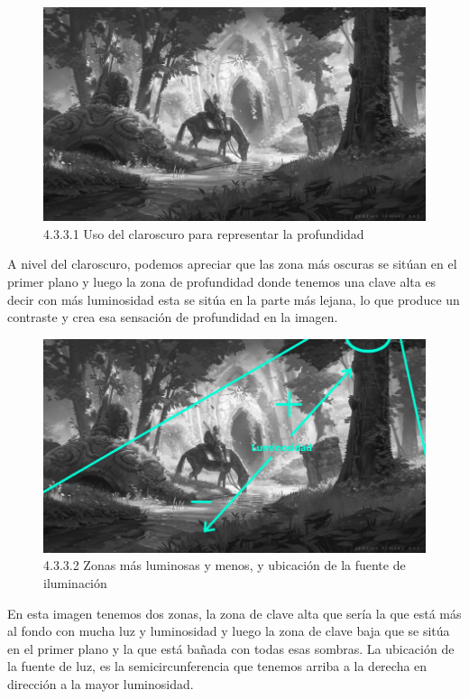 \documentclass[12pt]{article}
\begin{document}
        
    \begin{figure}[H]
      \centering
      \includegraphics[scale=0.7]{images/Saúl/Sección 3/EA_img3_3Claroscuro_1Profundidad.png}
      \caption{\small 4.3.3.1 Uso del claroscuro para representar la profundidad}
    \end{figure}

A nivel del claroscuro, podemos apreciar que las zona más oscuras se sitúan en el primer plano y luego la zona de profundidad donde tenemos una clave alta es decir con más luminosidad esta se sitúa en la parte más lejana, lo que produce un contraste y crea esa sensación de profundidad en la imagen.

    \begin{figure}[H]
      \centering
      \includegraphics[scale=0.7]{images/Saúl/Sección 3/EA_img3_3Claroscuro_2Luminosidad.png}
      \caption{\small 4.3.3.2 Zonas más luminosas y menos, y ubicación de la fuente de iluminación}
    \end{figure}

En esta imagen tenemos dos zonas, la zona de clave alta que sería la que está más al fondo con mucha luz y luminosidad y luego la zona de clave baja que se sitúa en el primer plano y la que está bañada con todas esas sombras. La ubicación de la fuente de luz, es la semicircunferencia que tenemos arriba a la derecha en dirección a la mayor luminosidad.
\end{document}
